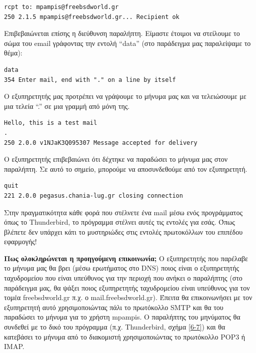 \begin{inthebox}
\begin{verbatim}
rcpt to: mpampis@freebsdworld.gr
250 2.1.5 mpampis@freebsdworld.gr... Recipient ok
\end{verbatim}

Επιβεβαιώνεται επίσης η διεύθυνση παραλήπτη. Είμαστε έτοιμοι να στείλουμε το σώμα του email γράφοντας την εντολή ``data'' (στο παράδειγμα μας παραλείψαμε το θέμα):

\begin{verbatim}
data
354 Enter mail, end with "." on a line by itself
\end{verbatim}

Ο εξυπηρετητής μας προτρέπει να γράψουμε το μήνυμα μας και να τελειώσουμε με μια τελεία ``.'' σε μια γραμμή από μόνη της.

\begin{verbatim}
Hello, this is a test mail
.
250 2.0.0 v1NJaK3Q095307 Message accepted for delivery
\end{verbatim}

Ο εξυπηρετητής επιβεβαιώνει ότι δέχτηκε να παραδώσει το μήνυμα μας στον παραλήπτη. Σε αυτό το σημείο, μπορούμε να αποσυνδεθούμε από τον εξυπηρετητή.

\begin{verbatim}
quit
221 2.0.0 pegasus.chania-lug.gr closing connection
\end{verbatim}


Στην πραγματικότητα κάθε φορά που στέλνετε ένα mail μέσω ενός προγράμματος όπως το Thunderbird, το πρόγραμμα στέλνει αυτές τις εντολές για εσάς. Όπως βλέπετε δεν υπάρχει κάτι το μυστηριώδες στις εντολές πρωτοκόλλων του επιπέδου εφαρμογής!\\
\end{inthebox}

\textbf{Πως ολοκληρώνεται η προηγούμενη επικοινωνία;} Ο εξυπηρετητής που παρέλαβε το μήνυμα μας θα βρει (μέσω ερωτήματος στο DNS) ποιος είναι ο εξυπηρετητής ταχυδρομείου που είναι υπεύθυνος για την περιοχή που ανήκει ο παραλήπτης (στο παράδειγμα μας, θα ψάξει ποιος εξυπηρετητής ταχυδρομείου είναι υπεύθυνος για τον τομέα freebsdworld.gr π.χ. ο mail.freebsdworld.gr). Έπειτα θα επικοινωνήσει με τον εξυπηρετητή αυτό χρησιμοποιώντας πάλι το πρωτόκολλο SMTP και θα του παραδώσει το μήνυμα για το χρήστη mpampis. Ο παραλήπτης του μηνύματος θα συνδεθεί με το δικό του πρόγραμμα (π.χ. Thunderbird, σχήμα \ref{6-7}) και θα κατεβάσει το μήνυμα από το διακομιστή χρησιμοποιώντας το πρωτόκολλο POP3 ή IMAP.


